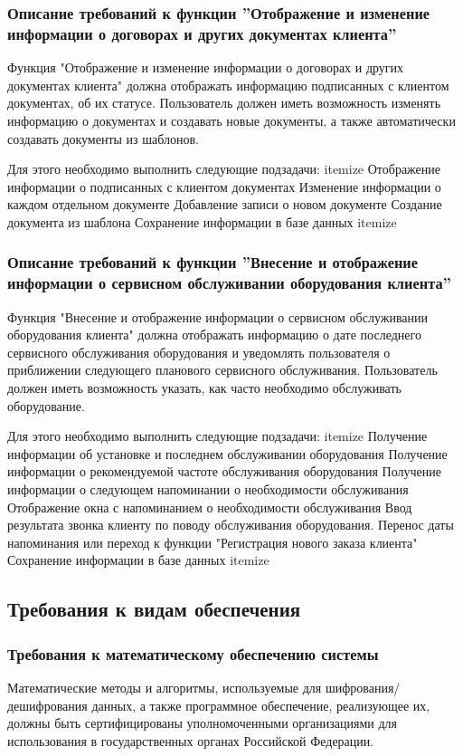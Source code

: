 \documentclass[russian, utf8, 12pt,pointsubsection,floatsubsection]{eskdtext}
\begin{document}
\subsubsection{Описание требований к функции ''Отображение и изменение информации о договорах и других документах клиента''}
Функция "Отображение и изменение информации о договорах и других документах клиента" должна отображать информацию подписанных с клиентом документах, об их статусе. Пользователь должен иметь возможность изменять информацию о документах и создавать новые документы, а также автоматически создавать документы из шаблонов.

Для этого необходимо выполнить следующие подзадачи:
itemize
Отображение информации о подписанных с клиентом документах
Изменение информации о каждом отдельном документе
Добавление записи о новом документе
Создание документа из шаблона
Сохранение информации в базе данных
itemize

\subsubsection{Описание требований к функции ''Внесение и отображение информации о сервисном обслуживании оборудования клиента''}
Функция "Внесение и отображение информации о сервисном обслуживании оборудования клиента" должна отображать информацию о дате последнего сервисного обслуживания оборудования и уведомлять пользователя о приближении следующего планового сервисного обслуживания. Пользователь должен иметь возможность указать, как часто необходимо обслуживать оборудование.

Для этого необходимо выполнить следующие подзадачи:
itemize
Получение информации об установке и последнем обслуживании оборудования
Получение информации о рекомендуемой частоте обслуживания оборудования
Получение информации о следующем напоминании о необходимости обслуживания
Отображение окна с напоминанием о необходимости обслуживания
Ввод результата звонка клиенту по поводу обслуживания оборудования. Перенос даты напоминания или переход к функции "Регистрация нового заказа клиента"
Сохранение информации в базе данных
itemize



\subsection{Требования к видам обеспечения}

\subsubsection{Требования к математическому обеспечению системы}
Математические методы и алгоритмы, используемые для шифрования/дешифрования данных, а также программное обеспечение, реализующее их, должны быть сертифицированы уполномоченными организациями для использования в государственных органах Российской Федерации.
\end{document}
